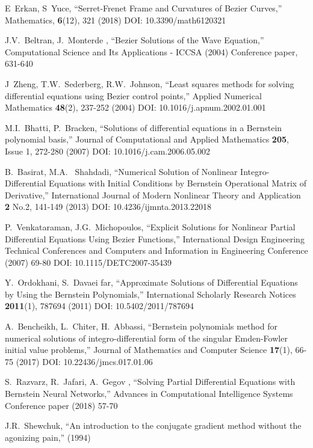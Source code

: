 \documentclass[12pt]{article}
\begin{document}
\begin{thebibliography}{0}
	E~Erkan, S~Yuce,
	``Serret-Frenet Frame and Curvatures of Bezier Curves,''
	Mathematics, \textbf{6}(12), 321 (2018)
	DOI: 10.3390/math6120321

	J.V.~Beltran, J.~Monterde ,
	``Bezier Solutions of the Wave Equation,''
	Computational Science and Its Applications - ICCSA (2004) Conference paper, 631-640

	J~Zheng, T.W.~Sederberg, R.W.~Johnson,
	``Least squares methods for solving differential equations using Bezier control points,''
	Applied Numerical Mathematics \textbf{48}(2), 237-252 (2004)
	DOI: 10.1016/j.apnum.2002.01.001

	M.I.~Bhatti, P.~Bracken,
	``Solutions of differential equations in a Bernstein polynomial basis,''
	Journal of Computational and Applied Mathematics  \textbf{205}, Issue 1, 272-280 (2007)
	DOI: 10.1016/j.cam.2006.05.002

	B.~Basirat, M.A.~ Shahdadi,
	``Numerical Solution of Nonlinear Integro-Differential Equations with Initial Conditions by Bernstein Operational Matrix of Derivative,''
	International Journal of Modern Nonlinear Theory and Application \textbf{2} No.2, 141-149 (2013)
	DOI: 10.4236/ijmnta.2013.22018

	P.~Venkataraman, J.G.~Michopoulos,
	``Explicit Solutions for Nonlinear Partial Differential Equations Using Bezier Functions,''
	International Design Engineering Technical Conferences and Computers and Information in Engineering Conference (2007) 69-80
	DOI: 10.1115/DETC2007-35439

	Y.~Ordokhani, S.~Davaei far,
	``Approximate Solutions of Differential Equations by Using the Bernstein Polynomials,''
	International Scholarly Research Notices \textbf{2011}(1), 787694 (2011)
	DOI: 10.5402/2011/787694

	A.~Bencheikh, L.~Chiter, H.~Abbassi,
	``Bernstein polynomials method for numerical solutions of  integro-differential form of the singular Emden-Fowler initial value problems,''
	Journal of Mathematics and Computer Science \textbf{17}(1), 66-75 (2017)
	DOI: 10.22436/jmcs.017.01.06	
	
	S.~Razvarz, R.~Jafari, A.~Gegov ,
	``Solving Partial Differential Equations with Bernstein Neural Networks,''
	Advances in Computational Intelligence Systems Conference paper (2018) 57-70

	J.R.~Shewchuk, 
	``An introduction to the conjugate gradient method without the agonizing pain,''
	(1994)

\end{thebibliography}
\end{document}

